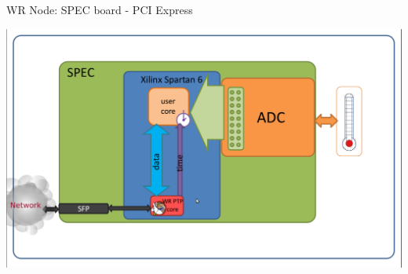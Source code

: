 \documentclass[compress,red]{beamer}
\begin{document}
\begin{frame}{WR Node: SPEC board - PCI Express}

    \begin{center}
    \includegraphics[width=1.0\textwidth]{../../figures/node/specInterior.pdf}
    \end{center}

\end{frame}
\end{document}
